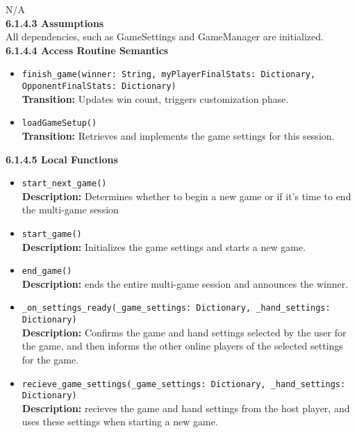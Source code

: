 \documentclass[12pt, titlepage]{article}
\begin{document}
N/A\\

\textbf{6.1.4.3 Assumptions}\\

All dependencies, such as GameSettings and GameManager are initialized.\\

\textbf{6.1.4.4 Access Routine Semantics}
\begin{itemize}

    \item \texttt{finish\_game(winner: String, myPlayerFinalStats: Dictionary, OpponentFinalStats: Dictionary)}\\
    \textbf{Transition:} Updates win count, triggers customization phase.
    
    \item \texttt{loadGameSetup()}\\
    \textbf{Transition:} Retrieves and implements the game settings for this session.

\end{itemize}

\textbf{6.1.4.5 Local Functions}
\begin{itemize}
    \item \texttt{start\_next\_game()}\\
	\textbf{Description:} Determines whether to begin a new game or if it's time to end the multi-game session 
    
    \item \texttt{start\_game()}\\
    \textbf{Description:} Initializes the game settings and starts a new game.
    
    \item \texttt{end\_game()}\\
    \textbf{Description:} ends the entire multi-game session and announces the winner.
    
    \item \texttt{\_on\_settings\_ready(\_game\_settings: Dictionary, \_hand\_settings: Dictionary)}\\
    \textbf{Description:} Confirms the game and hand settings selected by the user for the game, and then informs the other online players of the selected settings for the game.
    
    \item \texttt{recieve\_game\_settings(\_game\_settings: Dictionary, \_hand\_settings: Dictionary)}\\
    \textbf{Description:} recieves the game and hand settings from the host player, and uses these settings when starting a new game.
    
\end{itemize}
\end{document}
